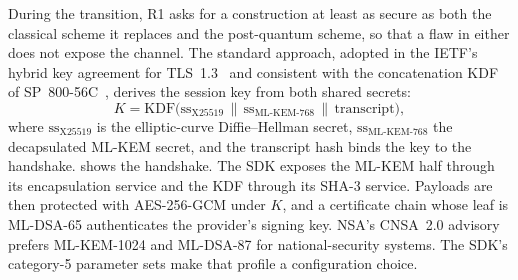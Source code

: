 During the transition, R1 asks for a construction at least as secure as both the classical scheme it replaces and the post-quantum scheme, so that a flaw in either does not expose the channel. The standard approach, adopted in the IETF's hybrid key agreement for TLS~1.3~\cite{kwiatkowski2025hybridtls} and consistent with the concatenation KDF of SP~800-56C~\cite{nist2020sp80056c}, derives the session key from both shared secrets:
\begin{equation}\label{eq:pqc:hybrid}
K = \mathrm{KDF}\bigl(\mathrm{ss}_{\text{X25519}} \,\|\, \mathrm{ss}_{\text{ML-KEM-768}} \,\|\, \mathrm{transcript}\bigr),
\end{equation}
where $\mathrm{ss}_{\text{X25519}}$ is the elliptic-curve Diffie--Hellman secret, $\mathrm{ss}_{\text{ML-KEM-768}}$ the decapsulated ML-KEM secret, and the transcript hash binds the key to the handshake.  shows the handshake. The SDK exposes the ML-KEM half through its encapsulation service and the KDF through its SHA-3 service. Payloads are then protected with AES-256-GCM under $K$, and a certificate chain whose leaf is ML-DSA-65 authenticates the provider's signing key. NSA's CNSA~2.0 advisory~\cite{nsa2022cnsa2} prefers ML-KEM-1024 and ML-DSA-87 for national-security systems. The SDK's category-5 parameter sets make that profile a configuration choice.

